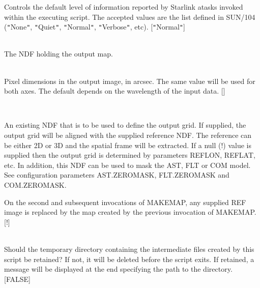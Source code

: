 \documentclass[twoside,11pt]{article}
\renewcommand{\_}{\texttt{\symbol{95}}}
\newcommand{\sstsubsection}[1]{ \item[{#1}] \mbox{} \\}
\newcommand{\sstsubsection}[1]{\item[{#1}]}
\begin{document}
{{{         Controls the default level of information reported by Starlink
         atasks invoked within the executing script. The accepted values
         are the list defined in SUN/104 ({\tt "}None{\tt "}, {\tt "}Quiet{\tt "}, {\tt "}Normal{\tt "},
         {\tt "}Verbose{\tt "}, etc). [{\tt "}Normal{\tt "}]
      }
      \sstsubsection{
         OUT = NDF (Write)
      }{
         The NDF holding the output map.
      }
      \sstsubsection{
         PIXSIZE = \_REAL (Read)
      }{
         Pixel dimensions in the output image, in arcsec. The same value
         will be used for both axes. The default depends on the wavelength
         of the input data. []
      }
      \sstsubsection{
         REF = NDF (Read)
      }{
         An existing NDF that is to be used to define the output grid.
         If supplied, the output grid will be aligned with the supplied
         reference NDF. The reference can be either 2D or 3D and the spatial
         frame will be extracted. If a null (!) value is supplied then the
         output grid is determined by parameters REFLON, REFLAT, etc.
         In addition, this NDF can be used to mask the AST, FLT or COM
         model. See configuration parameters AST.ZERO\_MASK, FLT.ZERO\_MASK
         and COM.ZERO\_MASK.

         On the second and subsequent invocations of MAKEMAP, any
         supplied REF image is replaced by the map created by the previous
         invocation of MAKEMAP. [!]
      }
      \sstsubsection{
         RETAIN = \_LOGICAL (Read)
      }{
         Should the temporary directory containing the intermediate files
         created by this script be retained? If not, it will be deleted
         before the script exits. If retained, a message will be
         displayed at the end specifying the path to the directory. [FALSE]
      }
   }
}
\end{document}

